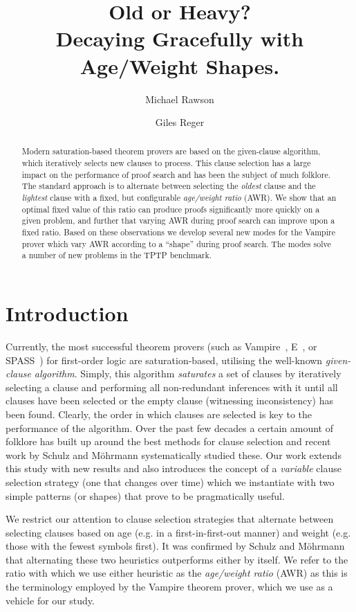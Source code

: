 \documentclass{llncs}
\title{Old or Heavy?\\Decaying Gracefully with Age/Weight Shapes.}
\author{Michael Rawson \and Giles Reger}
\institute{University of Manchester, Manchester, UK}
\newcommand{\sandm}{Schulz and M{\"{o}}hrmann}
\begin{document}
\maketitle
\begin{abstract}
Modern saturation-based theorem provers are based on the given-clause algorithm, which iteratively selects new clauses to process. This clause selection has a large impact on the performance of proof search and has been the subject of much folklore.  
The standard approach is to alternate between selecting the \emph{oldest} clause and the \emph{lightest} clause with a fixed, but configurable \emph{age/weight ratio} (AWR).
We show that an optimal fixed value of this ratio can produce proofs significantly more quickly on a given problem, and further that varying AWR during proof search can improve upon a fixed ratio.
Based on these observations we develop several new modes for the Vampire prover  which vary AWR according to a ``shape'' during proof search.
The modes solve a number of new problems in the TPTP benchmark.
\end{abstract}

\section{Introduction}
\label{sec:introduction}

Currently, the most successful theorem provers (such as Vampire~\cite{vampire}, E~\cite{E}, or SPASS~\cite{Spass}) for first-order logic are saturation-based, utilising the well-known \emph{given-clause algorithm}.
Simply, this algorithm \emph{saturates} a set of clauses by iteratively selecting a clause and performing all non-redundant inferences with it until all clauses have been selected or the empty clause (witnessing inconsistency) has been found.
Clearly, the order in which clauses are selected is key to the performance of the algorithm.
Over the past few decades a certain amount of folklore has built up around the best methods for clause selection and recent work by \sandm{} \cite{clause-selection-heuristics} systematically studied these.
Our work extends this study with new results and also introduces the concept of a \emph{variable} clause selection strategy (one that changes over time) which we instantiate with two simple patterns (or shapes) that prove to be pragmatically useful.

We restrict our attention to clause selection strategies that alternate between selecting clauses based on age (e.g. in a first-in-first-out manner) and weight (e.g. those with the fewest symbols first).
It was confirmed by \sandm{} that alternating these two heuristics outperforms either by itself.
We refer to the ratio with which we use either heuristic as the \emph{age/weight ratio} (AWR) as this is the terminology employed by the Vampire theorem prover, which we use as a vehicle for our study.
\end{document}
